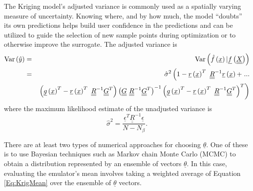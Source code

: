 \documentclass{article}
\begin{document}
The Kriging model's adjusted variance is commonly used as a spatially 
varying measure of uncertainty.  Knowing where, and by how much, the 
model ``doubts'' its own predictions helps build user confidence in 
the predictions and can be utilized to guide the selection of new 
sample points during optimization or to otherwise improve the 
surrogate.  The adjusted variance is
\begin{eqnarray*}
{\rm Var}\left(\hat{y}\right) &=& {\rm Var}\left(\hat{f}\left(\underline{x}\right)|\underline{f}\left(\underline{\underline{X}}\right)\right) \\ 
&=&\hat{\sigma}^2\left(1-\underline{r}\left(\underline{x}\right)^T\ \underline{\underline{R}}^{-1}\underline{r}\left(\underline{x}\right) + \right. ... \\
&&\left. \left(\underline{g}\left(\underline{x}\right)^T-\underline{r}\left(\underline{x}\right)^T\ \underline{\underline{R}}^{-1}\underline{\underline{G}}^T\right) \left(\underline{\underline{G}}\ \underline{\underline{R}}^{-1} \underline{\underline{G}}^T\right)^{-1}\left(\underline{g}\left(\underline{x}\right)^T-\underline{r}\left(\underline{x}\right)^T\ \underline{\underline{R}}^{-1}\underline{\underline{G}}^T\right)^T\right)
\end{eqnarray*}
where the maximum likelihood estimate of the unadjusted variance is
\begin{displaymath}
\hat{\sigma}^2=\frac{\underline{\epsilon}^T\underline{\underline{R}}^{-1}\underline{\epsilon}}{N-N_{\beta}}.
\end{displaymath}

There are at least two types of numerical approaches for choosing
$\underline{\theta}$.  One of these is to use Bayesian techniques such
as Markov chain Monte Carlo (MCMC) to obtain a distribution
represented by an ensemble of vectors $\underline{\theta}$.  In this
case, evaluating the emulator's mean involves taking a weighted
average of Equation \ref{Eq:KrigMean} over the ensemble of
$\underline{\theta}$ vectors.\newline
\end{document}
